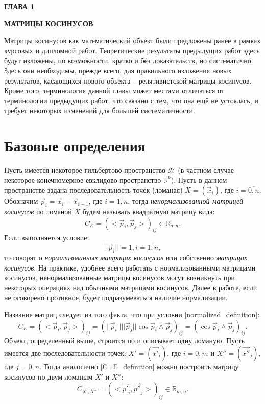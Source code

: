 \newpage
\begin{center}
	\textbf{\large ГЛАВА 1}

	\textbf{\large МАТРИЦЫ КОСИНУСОВ}
\end{center}

Матрицы косинусов как математический объект были предложены ранее в рамках курсовых и дипломной работ. Теоретические результаты предыдущих работ здесь будут изложены, по возможности, кратко и без доказательств, но систематично. Здесь они необходимы, прежде всего, для правильного изложения новых результатов, касающихся нового объекта -- релятивистской матрицы косинусов. Кроме того, терминология данной главы может местами отличаться от терминологии предыдущих работ, что связано с тем, что она ещё не устоялась, и требует некоторых изменений для большей систематичности.

\section{Базовые определения}
Пусть имеется некоторое гильбертово пространство $\mathcal{H}$ (в частном случае некоторое конечномерное евклидово пространство $\mathbb{R}^{k}$).
Пусть в данном пространстве задана последовательность точек (ломаная) $X = (\vec{x}_i)$, где $i = \overline{0,n}$. Обозначим $\vec{p}_{i} = \vec{x}_i - \vec{x}_{i-1}$, где $i = \overline{1,n}$, тогда \textit{ненормализованной матрицей косинусов} по ломаной $X$ будем называть квадратную матрицу вида:
\begin{equation}
	{C}_{E} = {(<\vec{p}_{i}, \vec{p}_{j}>)}_{ij} \in \mathbb{R}_{n,n}.
	\label{C_E_definition}
\end{equation}
Если выполняется условие:
\begin{equation}
	||\vec{p}_{i}|| = 1, i = \overline{1,n},
	\label{normalized_definition}
\end{equation}
то говорят о \textit{нормализованных матрицах косинусов} или собственно \textit{матрицах косинусов}. На практике, удобнее всего работать с нормализованными матрицами косинусов, ненормализованные матрицы косинусов могут возникнуть при некоторых операциях над обычными матрицами косинусов. Далее в работе, если не оговорено противное, будет подразумеваться наличие нормализации. 

Название матриц следует из того факта, что при условии \ref{normalized_definition}:
\begin{equation}
	{C}_{E} = {(<\vec{p}_{i}, \vec{p}_{j}>)}_{ij} = {(||\vec{p}_{i}|| ||\vec{p}_{j}|| \cos{\vec{p}_{i} \wedge \vec{p}_{j}})}_{ij} = {(\cos{\vec{p}_{i} \wedge \vec{p}_{j}})}_{ij}.
	\label{name_cosine}
\end{equation}
Объект, определенный выше, строится по и описывает одну ломаную. Пусть имеется две последовательности точек: $X' = (\vec{x'}_{i})$, где $i = \overline{0,m}$ и $X'' = (\vec{x''}_{j})$, где $j = \overline{0,n}$. Тогда аналогично \ref{C_E_definition} можно построить матрицу косинусов по двум ломаным $X'$ и $X''$:
\begin{equation}
	{C}_{X',X''} = {(<\vec{p'}_{i}, \vec{p''}_{j}>)}_{ij} \in \mathbb{R}_{m,n}.
	\label{C_X1X2_definition}
\end{equation}


